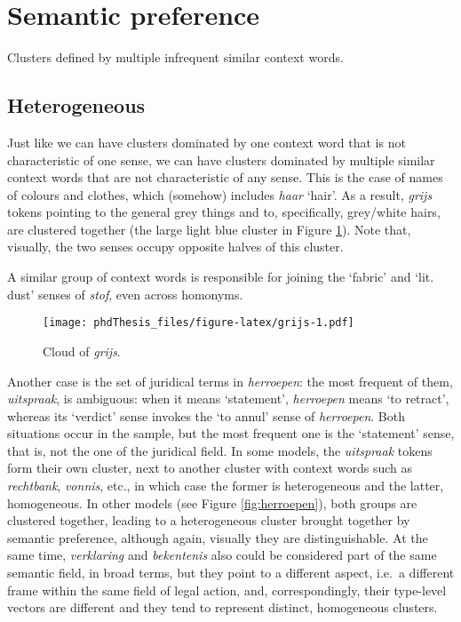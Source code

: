 \documentclass[
]{book}
\begin{document}
\hypertarget{semantic-preference}{%
\section{Semantic preference}\label{semantic-preference}}

Clusters defined by multiple infrequent similar context words.

\hypertarget{heterogeneous-1}{%
\subsection{Heterogeneous}\label{heterogeneous-1}}

Just like we can have clusters dominated by one context word that is not characteristic of one sense, we can have clusters dominated by multiple similar context words that are not characteristic of any sense. This is the case of names of colours and clothes, which (somehow) includes \emph{haar} `hair'. As a result, \emph{grijs} tokens pointing to the general grey things and to, specifically, grey/white hairs, are clustered together (the large light blue cluster in Figure \ref{fig:grijs}). Note that, visually, the two senses occupy opposite halves of this cluster.

A similar group of context words is responsible for joining the `fabric' and `lit. dust' senses of \emph{stof}, even across homonyms.



\begin{figure}
\centering
\texttt{[image: phdThesis\_files/figure-latex/grijs-1.pdf]}
\caption{\label{fig:grijs}Cloud of \emph{grijs}.}
\end{figure}

Another case is the set of juridical terms in \emph{herroepen}: the most frequent of them, \emph{uitspraak}, is ambiguous: when it means `statement', \emph{herroepen} means `to retract', whereas its `verdict' sense invokes the `to annul' sense of \emph{herroepen}. Both situations occur in the sample, but the most frequent one is the `statement' sense, that is, not the one of the juridical field. In some models, the \emph{uitspraak} tokens form their own cluster, next to another cluster with context words such as \emph{rechtbank}, \emph{vonnis}, etc., in which case the former is heterogeneous and the latter, homogeneous. In other models (see Figure \ref{fig:herroepen}), both groups are clustered together, leading to a heterogeneous cluster brought together by semantic preference, although again, visually they are distinguishable. At the same time, \emph{verklaring} and \emph{bekentenis} also could be considered part of the same semantic field, in broad terms, but they point to a different aspect, i.e.~a different frame within the same field of legal action, and, correspondingly, their type-level vectors are different and they tend to represent distinct, homogeneous clusters.
\end{document}

